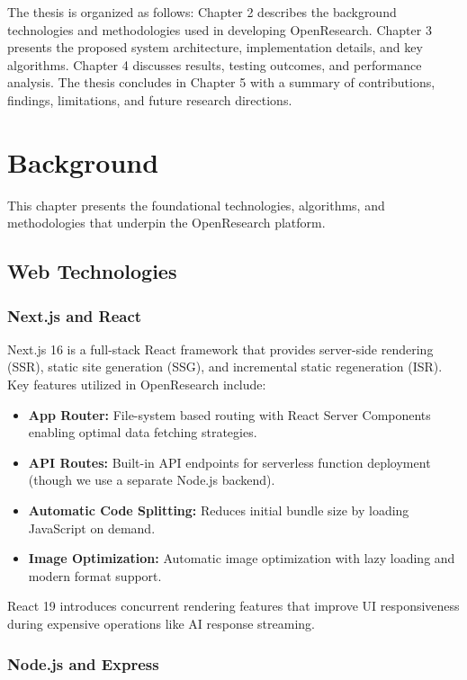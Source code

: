 \documentclass[12pt]{report}
\begin{document}
The thesis is organized as follows: Chapter 2 describes the background technologies and methodologies used in developing OpenResearch. Chapter 3 presents the proposed system architecture, implementation details, and key algorithms. Chapter 4 discusses results, testing outcomes, and performance analysis. The thesis concludes in Chapter 5 with a summary of contributions, findings, limitations, and future research directions.

\chapter{Background}

This chapter presents the foundational technologies, algorithms, and methodologies that underpin the OpenResearch platform.

\section{Web Technologies}

\subsection{Next.js and React}

Next.js 16 is a full-stack React framework that provides server-side rendering (SSR), static site generation (SSG), and incremental static regeneration (ISR). Key features utilized in OpenResearch include:

\begin{itemize}
    \item \textbf{App Router:} File-system based routing with React Server Components enabling optimal data fetching strategies.
    \item \textbf{API Routes:} Built-in API endpoints for serverless function deployment (though we use a separate Node.js backend).
    \item \textbf{Automatic Code Splitting:} Reduces initial bundle size by loading JavaScript on demand.
    \item \textbf{Image Optimization:} Automatic image optimization with lazy loading and modern format support.
\end{itemize}

React 19 introduces concurrent rendering features that improve UI responsiveness during expensive operations like AI response streaming.

\subsection{Node.js and Express}
\end{document}
